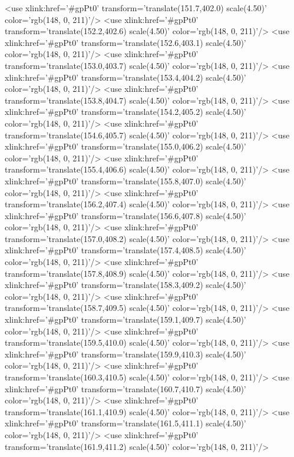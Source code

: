 	<use xlink:href='#gpPt0' transform='translate(151.7,402.0) scale(4.50)' color='rgb(148,   0, 211)'/>
	<use xlink:href='#gpPt0' transform='translate(152.2,402.6) scale(4.50)' color='rgb(148,   0, 211)'/>
	<use xlink:href='#gpPt0' transform='translate(152.6,403.1) scale(4.50)' color='rgb(148,   0, 211)'/>
	<use xlink:href='#gpPt0' transform='translate(153.0,403.7) scale(4.50)' color='rgb(148,   0, 211)'/>
	<use xlink:href='#gpPt0' transform='translate(153.4,404.2) scale(4.50)' color='rgb(148,   0, 211)'/>
	<use xlink:href='#gpPt0' transform='translate(153.8,404.7) scale(4.50)' color='rgb(148,   0, 211)'/>
	<use xlink:href='#gpPt0' transform='translate(154.2,405.2) scale(4.50)' color='rgb(148,   0, 211)'/>
	<use xlink:href='#gpPt0' transform='translate(154.6,405.7) scale(4.50)' color='rgb(148,   0, 211)'/>
	<use xlink:href='#gpPt0' transform='translate(155.0,406.2) scale(4.50)' color='rgb(148,   0, 211)'/>
	<use xlink:href='#gpPt0' transform='translate(155.4,406.6) scale(4.50)' color='rgb(148,   0, 211)'/>
	<use xlink:href='#gpPt0' transform='translate(155.8,407.0) scale(4.50)' color='rgb(148,   0, 211)'/>
	<use xlink:href='#gpPt0' transform='translate(156.2,407.4) scale(4.50)' color='rgb(148,   0, 211)'/>
	<use xlink:href='#gpPt0' transform='translate(156.6,407.8) scale(4.50)' color='rgb(148,   0, 211)'/>
	<use xlink:href='#gpPt0' transform='translate(157.0,408.2) scale(4.50)' color='rgb(148,   0, 211)'/>
	<use xlink:href='#gpPt0' transform='translate(157.4,408.5) scale(4.50)' color='rgb(148,   0, 211)'/>
	<use xlink:href='#gpPt0' transform='translate(157.8,408.9) scale(4.50)' color='rgb(148,   0, 211)'/>
	<use xlink:href='#gpPt0' transform='translate(158.3,409.2) scale(4.50)' color='rgb(148,   0, 211)'/>
	<use xlink:href='#gpPt0' transform='translate(158.7,409.5) scale(4.50)' color='rgb(148,   0, 211)'/>
	<use xlink:href='#gpPt0' transform='translate(159.1,409.7) scale(4.50)' color='rgb(148,   0, 211)'/>
	<use xlink:href='#gpPt0' transform='translate(159.5,410.0) scale(4.50)' color='rgb(148,   0, 211)'/>
	<use xlink:href='#gpPt0' transform='translate(159.9,410.3) scale(4.50)' color='rgb(148,   0, 211)'/>
	<use xlink:href='#gpPt0' transform='translate(160.3,410.5) scale(4.50)' color='rgb(148,   0, 211)'/>
	<use xlink:href='#gpPt0' transform='translate(160.7,410.7) scale(4.50)' color='rgb(148,   0, 211)'/>
	<use xlink:href='#gpPt0' transform='translate(161.1,410.9) scale(4.50)' color='rgb(148,   0, 211)'/>
	<use xlink:href='#gpPt0' transform='translate(161.5,411.1) scale(4.50)' color='rgb(148,   0, 211)'/>
	<use xlink:href='#gpPt0' transform='translate(161.9,411.2) scale(4.50)' color='rgb(148,   0, 211)'/>
